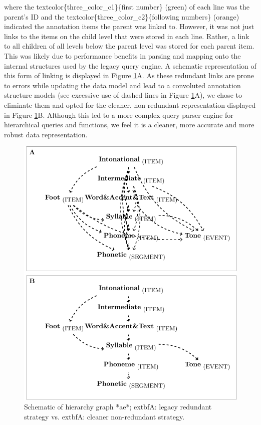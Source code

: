 \documentclass[]{book}
\theoremstyle{definition}
\theoremstyle{definition}
\theoremstyle{definition}
\theoremstyle{remark}
\begin{document}
where the textcolor\{three\_color\_c1\}\{first number\} (green) of each
line was the parent's ID and the
textcolor\{three\_color\_c2\}\{following numbers\} (orange) indicated
the annotation items the parent was linked to. However, it was not just
links to the items on the child level that were stored in each line.
Rather, a link to all children of all levels below the parent level was
stored for each parent item. This was likely due to performance benefits
in parsing and mapping onto the internal structures used by the legacy
query engine. A schematic representation of this form of linking is
displayed in Figure \ref{fig:query-redundant}A. As these redundant links
are prone to errors while updating the data model and lead to a
convoluted annotation structure models (see excessive use of dashed
lines in Figure \ref{fig:query-redundant}A), we chose to eliminate them
and opted for the cleaner, non-redundant representation displayed in
Figure \ref{fig:query-redundant}B. Although this led to a more complex
query parser engine for hierarchical queries and functions, we feel it
is a cleaner, more accurate and more robust data representation.

\begin{figure}

{\centering \includegraphics[width=0.75\linewidth]{pics/aeGraph_redundant} 

}

\caption{Schematic of hierarchy graph *ae*;     extbf{A}: legacy redundant strategy vs.     extbf{A}: cleaner non-redundant strategy.}\label{fig:query-redundant}
\end{figure}
\end{document}

